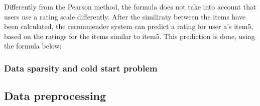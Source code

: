 Differently from the Pearson method, the formula does not take into account that users use a rating scale differently. 
After the similiraty between the items have been calculated, the recommender system can predict a rating for user a's item5, based on the ratings for the items similar to item5. This prediction is done, using the formula below:

\subsubsection{Data sparsity and cold start problem}
\subsection{Data preprocessing} %
\label{sub:data_preprocessing}

